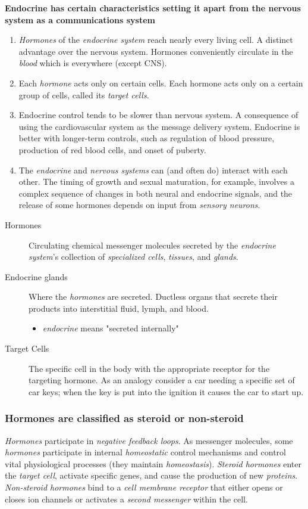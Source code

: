 \documentclass[11pt]{article}
\begin{document}
\textbf{Endocrine has certain characteristics setting it apart from the nervous system
as a communications system}
\begin{enumerate}
\item \emph{Hormones} of the \emph{endocrine system} reach nearly every living cell. A distinct
advantage over the nervous system. Hormones conveniently circulate in the
\emph{blood} which is everywhere (except CNS).
\item Each \emph{hormone} acts only on certain cells. Each hormone acts only on a certain
group of cells, called its \emph{target cells}.
\item Endocrine control tends to be slower than nervous system. A consequence of
using the cardiovascular system as the message delivery system. Endocrine is
better with longer-term controls, such as regulation of blood pressure,
production of red blood cells, and onset of puberty.
\item The \emph{endocrine} and \emph{nervous systems} can (and often do) interact with each
other. The timing of growth and sexual maturation, for example, involves a
complex sequence of changes in both neural and endocrine signals, and the
release of some hormones depends on input from \emph{sensory neurons}.
\end{enumerate}


\begin{description}
\item[{Hormones}] Circulating chemical messenger molecules secreted by the \emph{endocrine
system}'s collection of \emph{specialized cells}, \emph{tissues}, and \emph{glands}.
\item[{Endocrine glands}] Where the \emph{hormones} are secreted. Ductless organs that
secrete their products into interstitial fluid, lymph, and blood.
\begin{itemize}
\item \emph{endocrine} means "secreted internally"
\end{itemize}
\item[{Target Cells}] The specific cell in the body with the appropriate receptor
for the targeting hormone. As an analogy consider a car needing a specific
set of car keys; when the key is put into the ignition it causes the car to
start up.
\end{description}

\subsubsection{Hormones are classified as steroid or non-steroid}
\label{sec:orgf36905c}
\emph{Hormones} participate in \emph{negative feedback loops}. As messenger molecules, some
\emph{hormones} participate in internal \emph{homeostatic} control mechanisms and control
vital physiological processes (they maintain \emph{homeostasis}). \emph{Steroid hormones}
enter the \emph{target cell}, activate specific genes, and cause the production of new
\emph{proteins}. \emph{Non-steroid hormones} bind to a \emph{cell membrane receptor} that either
opens or closes ion channels or activates a \emph{second messenger} within the cell.
\end{document}
